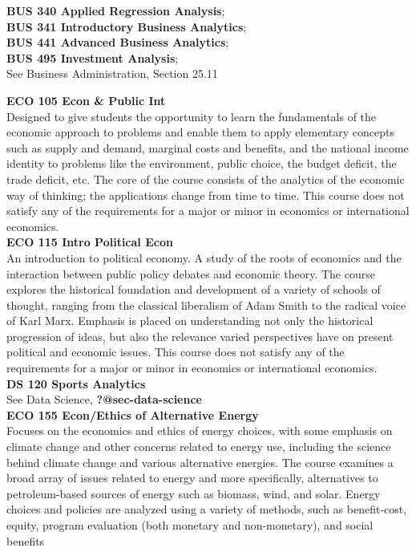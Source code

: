 \documentclass[
  letterpaper,
]{scrbook}
\begin{document}
\textbf{BUS 340 Applied Regression Analysis};\\
\textbf{BUS 341 Introductory Business Analytics};\\
\textbf{BUS 441 Advanced Business Analytics};\\
\textbf{BUS 495 Investment Analysis};\\
See Business Administration, Section 25.11

\textbf{ECO 105 Econ \& Public Int}\\
Designed to give students the opportunity to learn the fundamentals of
the economic approach to problems and enable them to apply elementary
concepts such as supply and demand, marginal costs and benefits, and the
national income identity to problems like the environment, public
choice, the budget deficit, the trade deficit, etc. The core of the
course consists of the analytics of the economic way of thinking; the
applications change from time to time. This course does not satisfy any
of the requirements for a major or minor in economics or international
economics.\\
\textbf{ECO 115 Intro Political Econ}\\
An introduction to political economy. A study of the roots of economics
and the interaction between public policy debates and economic theory.
The course explores the historical foundation and development of a
variety of schools of thought, ranging from the classical liberalism of
Adam Smith to the radical voice of Karl Marx. Emphasis is placed on
understanding not only the historical progression of ideas, but also the
relevance varied perspectives have on present political and economic
issues. This course does not satisfy any of the requirements for a major
or minor in economics or international economics.\\
\textbf{DS 120 Sports Analytics}\\
See Data Science, \textbf{?@sec-data-science}\\
\textbf{ECO 155 Econ/Ethics of Alternative Energy}\\
Focuses on the economics and ethics of energy choices, with some
emphasis on climate change and other concerns related to energy use,
including the science behind climate change and various alternative
energies. The course examines a broad array of issues related to energy
and more specifically, alternatives to petroleum-based sources of energy
such as biomass, wind, and solar. Energy choices and policies are
analyzed using a variety of methods, such as benefit-cost, equity,
program evaluation (both monetary and non-monetary), and social benefits
\end{document}
